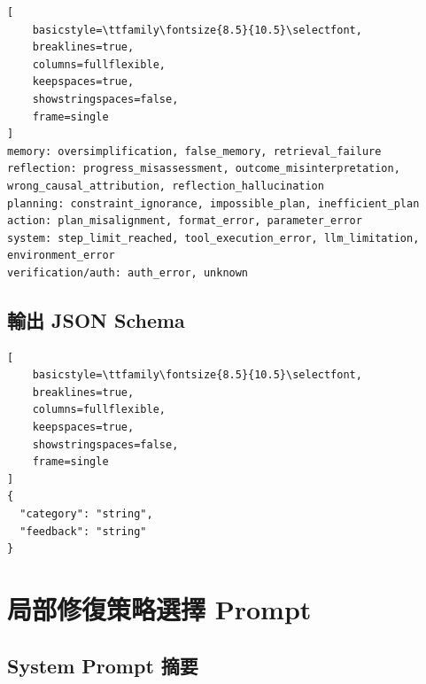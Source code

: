 \begin{lstlisting}[
    basicstyle=\ttfamily\fontsize{8.5}{10.5}\selectfont,
    breaklines=true,
    columns=fullflexible,
    keepspaces=true,
    showstringspaces=false,
    frame=single
]
memory: oversimplification, false_memory, retrieval_failure
reflection: progress_misassessment, outcome_misinterpretation, wrong_causal_attribution, reflection_hallucination
planning: constraint_ignorance, impossible_plan, inefficient_plan
action: plan_misalignment, format_error, parameter_error
system: step_limit_reached, tool_execution_error, llm_limitation, environment_error
verification/auth: auth_error, unknown
\end{lstlisting}

\subsection*{輸出 JSON Schema}

\begin{lstlisting}[
    basicstyle=\ttfamily\fontsize{8.5}{10.5}\selectfont,
    breaklines=true,
    columns=fullflexible,
    keepspaces=true,
    showstringspaces=false,
    frame=single
]
{
  "category": "string",
  "feedback": "string"
}
\end{lstlisting}

\section{局部修復策略選擇 Prompt}
\label{app:repair-strategy-prompt}

\subsection*{System Prompt 摘要}


